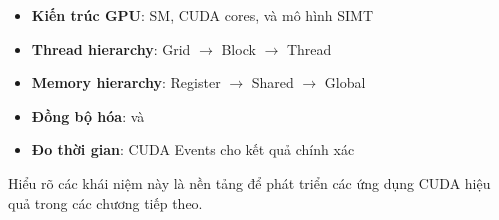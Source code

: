 \begin{itemize}
    \item \textbf{Kiến trúc GPU}: SM, CUDA cores, và mô hình SIMT
    \item \textbf{Thread hierarchy}: Grid $\rightarrow$ Block $\rightarrow$ Thread
    \item \textbf{Memory hierarchy}: Register $\rightarrow$ Shared $\rightarrow$ Global
    \item \textbf{Đồng bộ hóa}:  và 
    \item \textbf{Đo thời gian}: CUDA Events cho kết quả chính xác
\end{itemize}

Hiểu rõ các khái niệm này là nền tảng để phát triển các ứng dụng CUDA hiệu quả trong các chương tiếp theo.
